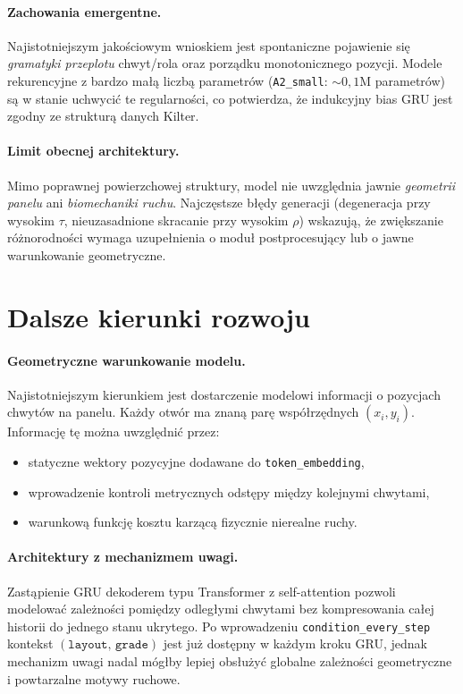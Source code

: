 \documentclass[12pt,a4paper]{article}
\begin{document}
\paragraph{Zachowania emergentne.}
Najistotniejszym jakościowym wnioskiem jest spontaniczne pojawienie się \emph{gramatyki przeplotu} chwyt/rola oraz porządku monotonicznego pozycji. Modele rekurencyjne z bardzo małą liczbą parametrów (\texttt{A2\_small}: $\sim 0{,}1$M parametrów) są w stanie uchwycić te regularności, co potwierdza, że indukcyjny bias GRU jest zgodny ze strukturą danych Kilter.

\paragraph{Limit obecnej architektury.}
Mimo poprawnej powierzchowej struktury, model nie uwzględnia jawnie \emph{geometrii panelu} ani \emph{biomechaniki ruchu}. Najczęstsze błędy generacji (degeneracja przy wysokim $\tau$, nieuzasadnione skracanie przy wysokim $\rho$) wskazują, że zwiększanie różnorodności wymaga uzupełnienia o moduł postprocesujący lub o jawne warunkowanie geometryczne.

\section{Dalsze kierunki rozwoju}
\label{sec:future-work}

\paragraph{Geometryczne warunkowanie modelu.}
Najistotniejszym kierunkiem jest dostarczenie modelowi informacji o pozycjach chwytów na panelu. Każdy otwór ma znaną parę współrzędnych $(x_i, y_i)$. Informację tę można uwzględnić przez:
\begin{itemize}[leftmargin=1.5em]
    \item statyczne wektory pozycyjne dodawane do \texttt{token\_embedding},
    \item wprowadzenie kontroli metrycznych odstępy między kolejnymi chwytami,
    \item warunkową funkcję kosztu karzącą fizycznie nierealne ruchy.
\end{itemize}

\paragraph{Architektury z mechanizmem uwagi.}
Zastąpienie GRU dekoderem typu Transformer \citep{sutskever2014seq2seq} z self-attention pozwoli modelować zależności pomiędzy odległymi chwytami bez kompresowania całej historii do jednego stanu ukrytego. Po wprowadzeniu \texttt{condition\_every\_step} kontekst $(\texttt{layout},\,\texttt{grade})$ jest już dostępny w każdym kroku GRU, jednak mechanizm uwagi nadal mógłby lepiej obsłużyć globalne zależności geometryczne i powtarzalne motywy ruchowe.
\end{document}
